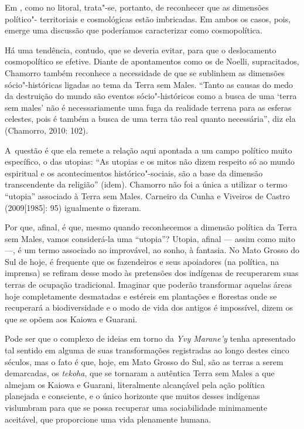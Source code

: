 Em , como no litoral, trata"-se, portanto, de reconhecer que as
dimensões político"- territoriais e cosmológicas estão imbricadas. Em
ambos os casos, pois, emerge uma discussão que poderíamos caracterizar
como cosmopolítica.

Há uma tendência, contudo, que se deveria evitar, para que o
deslocamento cosmopolítico se efetive. Diante de apontamentos como os
de Noelli, supracitados, Chamorro também reconhece a necessidade de que
se sublinhem as dimensões sócio"-históricas ligadas ao tema da Terra sem
Males. ``Tanto as causas do medo da destruição do mundo são eventos
sócio"-históricos como a busca de uma ‘terra sem males’ não é
necessariamente uma fuga da realidade terrena para as esferas celestes,
pois é também a busca de uma terra tão real quanto necessária'', diz ela
(Chamorro, 2010: 102). 

A~questão é que ela remete a relação aqui apontada a um campo político
muito específico, o das utopias: ``As utopias e os mitos não dizem
respeito só ao mundo espiritual e os acontecimentos histórico"-sociais,
são a base da dimensão transcendente da religião'' (idem). Chamorro não
foi a única a utilizar o termo ``utopia'' associado à Terra sem Males.
Carneiro da Cunha e Viveiros de Castro (2009[1985]: 95) igualmente o
fizeram. 

Por que, afinal, é que, mesmo quando reconhecemos a dimensão política da
Terra sem Males, vamos considerá-la uma ``utopia''? Utopia, afinal ---
assim como mito ---, é um termo associado ao improvável, ao sonho, à
fantasia. No Mato Grosso do Sul de hoje, é frequente que os fazendeiros
e seus apoiadores (na política, na imprensa) se refiram desse modo às
pretensões dos indígenas de recuperarem suas terras de ocupação
tradicional. Imaginar que poderão transformar aquelas áreas hoje
completamente desmatadas e estéreis em plantações e florestas onde se
recuperará a biodiversidade e o modo de vida dos antigos é impossível,
dizem os que se opõem aos Kaiowa e Guarani.

Pode ser que o complexo de ideias em torno da \emph{Yvy Marane’y} tenha
apresentado tal sentido em alguma de suas transformações registradas ao
longo destes cinco séculos, mas o fato é que, hoje, em Mato Grosso do
Sul, são as terras a serem demarcadas, os \emph{tekoha}, que se tornaram a
autêntica Terra sem Males a que almejam os Kaiowa e Guarani,
literalmente alcançável pela ação política planejada e consciente, e o
único horizonte que muitos desses indígenas vislumbram para que se
possa recuperar uma sociabilidade minimamente aceitável, que
proporcione uma vida plenamente humana.

